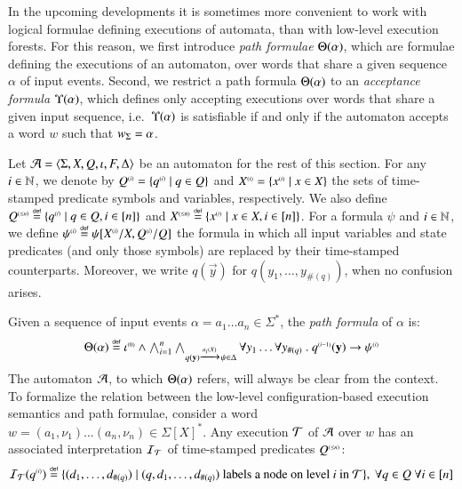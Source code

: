 In the upcoming developments it is sometimes more convenient to work
with logical formulae defining executions of automata, than with
low-level execution forests. For this reason, we first introduce
\emph{path formulae} $\Theta({\alpha})$, which are formulae defining
the executions of an automaton, over words that share a given sequence
$\alpha$ of input events.  Second, we restrict a path formula
$\Theta({\alpha})$ to an \emph{acceptance formula}
$\Upsilon({\alpha})$, which defines only accepting executions over words
that share a given input sequence, i.e.\ $\Upsilon({\alpha})$ is
satisfiable if and only if the automaton accepts a word $w$ such that
${w}_\Sigma = \alpha$.

Let $\mathcal{A} = \langle \Sigma,X,Q,\iota,F,\Delta \rangle$ be an automaton for the
rest of this section. For any $i \in {\bf \mathbb{N}}$, we denote by ${Q}^{\scriptscriptstyle{({i})}}
= \{ {q}^{\scriptscriptstyle{({i})}} \mid q \in Q \}$ and ${X}^{\scriptscriptstyle{({i})}} =
\{ {x}^{\scriptscriptstyle{({i})}} \mid x \in X \}$ the sets of time-stamped predicate
symbols and variables, respectively. We also define ${Q}^{\scriptscriptstyle{({\leq n})}}
\stackrel{\scriptscriptstyle{\mathsf{def}}}{=} \{ {q}^{\scriptscriptstyle{({i})}} \mid q \in Q, i \in [n] \}$ and ${X}^{\scriptscriptstyle{({\leq
  n})}} \stackrel{\scriptscriptstyle{\mathsf{def}}}{=} \{ {x}^{\scriptscriptstyle{({i})}} \mid x \in X, i \in [n] \}$. For a formula
$\psi$ and $i \in {\bf \mathbb{N}}$, we define ${\psi}^{\scriptscriptstyle{({i})}} \stackrel{\scriptscriptstyle{\mathsf{def}}}{=}
\psi[{X}^{\scriptscriptstyle{({i})}}/X,{Q}^{\scriptscriptstyle{({i})}}/Q]$ the formula in which all input
variables and state predicates (and only those symbols) are replaced
by their time-stamped counterparts. Moreover, we write $q(\vec{y})$
for $q(y_1,\ldots,y_{\#(q)})$, when no confusion arises.

Given a sequence of input events $\alpha = a_1 \ldots a_n \in
\Sigma^*$, the \emph{path formula} of $\alpha$ is:
\begin{equation}\label{eq:pathform}
\begin{array}{c}
\Theta({\alpha}) \stackrel{\scriptscriptstyle{\mathsf{def}}}{=} {\iota}^{\scriptscriptstyle{({0})}} \wedge 
\bigwedge_{i=1}^n \bigwedge_{q(\mathbf y) \xrightarrow{{\scriptscriptstyle a_i(X)}}_{{\scriptstyle }}
  \psi \in \Delta} \forall y_1 \ldots \forall y_{\#(q)} ~.~
{q}^{\scriptscriptstyle{({i-1})}}(\mathbf y) \rightarrow {\psi}^{\scriptscriptstyle{({i})}}
\end{array}
\end{equation}
The automaton $\mathcal{A}$, to which $\Theta({\alpha})$ refers, will always
be clear from the context. To formalize the relation between the
low-level configuration-based execution semantics and path formulae,
consider a word $w=(a_1,\nu_1) \ldots (a_n,\nu_n) \in
\Sigma[X]^*$. Any execution $\mathcal{T}$ of $\mathcal{A}$ over $w$ has an associated
interpretation $\mathcal{I}_{\mathcal{T}}$ of time-stamped predicates ${Q}^{\scriptscriptstyle{({\leq
  n})}}$:
\[\mathcal{I}_{\mathcal{T}}({q}^{\scriptscriptstyle{({i})}}) \stackrel{\scriptscriptstyle{\mathsf{def}}}{=} \{ (d_1,\ldots,d_{\#(q)}) \mid
  (q,d_1,\ldots,d_{\#(q)}) \text{ labels a node on level $i$ in $\mathcal{T}$} \}
,~\forall q\in Q ~\forall i \in [n]\]

